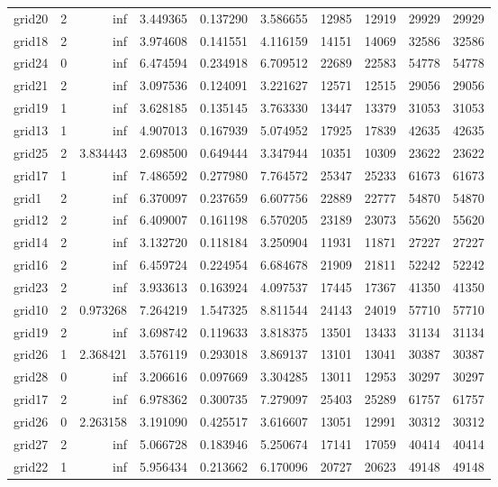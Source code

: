 \begin{longtable}{|l|r|r|r|r|r|r|r|r|r|}
grid20 & 2 & inf & 3.449365 & 0.137290 & 3.586655 & 12985 & 12919 & 29929 & 29929 \\
grid18 & 2 & inf & 3.974608 & 0.141551 & 4.116159 & 14151 & 14069 & 32586 & 32586 \\
grid24 & 0 & inf & 6.474594 & 0.234918 & 6.709512 & 22689 & 22583 & 54778 & 54778 \\
grid21 & 2 & inf & 3.097536 & 0.124091 & 3.221627 & 12571 & 12515 & 29056 & 29056 \\
grid19 & 1 & inf & 3.628185 & 0.135145 & 3.763330 & 13447 & 13379 & 31053 & 31053 \\
grid13 & 1 & inf & 4.907013 & 0.167939 & 5.074952 & 17925 & 17839 & 42635 & 42635 \\
grid25 & 2 & 3.834443 & 2.698500 & 0.649444 & 3.347944 & 10351 & 10309 & 23622 & 23622 \\
grid17 & 1 & inf & 7.486592 & 0.277980 & 7.764572 & 25347 & 25233 & 61673 & 61673 \\
grid1 & 2 & inf & 6.370097 & 0.237659 & 6.607756 & 22889 & 22777 & 54870 & 54870 \\
grid12 & 2 & inf & 6.409007 & 0.161198 & 6.570205 & 23189 & 23073 & 55620 & 55620 \\
grid14 & 2 & inf & 3.132720 & 0.118184 & 3.250904 & 11931 & 11871 & 27227 & 27227 \\
grid16 & 2 & inf & 6.459724 & 0.224954 & 6.684678 & 21909 & 21811 & 52242 & 52242 \\
grid23 & 2 & inf & 3.933613 & 0.163924 & 4.097537 & 17445 & 17367 & 41350 & 41350 \\
grid10 & 2 & 0.973268 & 7.264219 & 1.547325 & 8.811544 & 24143 & 24019 & 57710 & 57710 \\
grid19 & 2 & inf & 3.698742 & 0.119633 & 3.818375 & 13501 & 13433 & 31134 & 31134 \\
grid26 & 1 & 2.368421 & 3.576119 & 0.293018 & 3.869137 & 13101 & 13041 & 30387 & 30387 \\
grid28 & 0 & inf & 3.206616 & 0.097669 & 3.304285 & 13011 & 12953 & 30297 & 30297 \\
grid17 & 2 & inf & 6.978362 & 0.300735 & 7.279097 & 25403 & 25289 & 61757 & 61757 \\
grid26 & 0 & 2.263158 & 3.191090 & 0.425517 & 3.616607 & 13051 & 12991 & 30312 & 30312 \\
grid27 & 2 & inf & 5.066728 & 0.183946 & 5.250674 & 17141 & 17059 & 40414 & 40414 \\
grid22 & 1 & inf & 5.956434 & 0.213662 & 6.170096 & 20727 & 20623 & 49148 & 49148 \\

\end{longtable}
